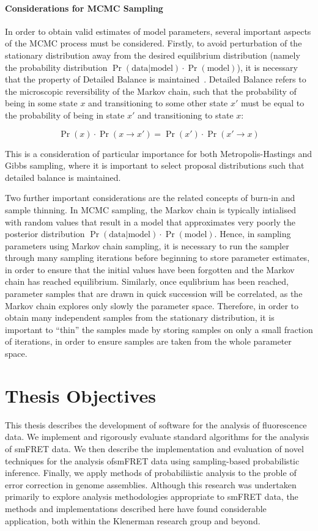 \paragraph{Considerations for MCMC Sampling}
In order to obtain valid estimates of model parameters, several important aspects of the MCMC process must be considered. Firstly, to avoid perturbation of the stationary distribution away from the desired equilibrium distribution (namely the probability distribution $\Pr(\text{data}|\text{model}) \cdot \Pr(\text{model})$), it is necessary that the property of Detailed Balance is maintained~\cite{???}. Detailed Balance refers to the microscopic reversibility of the Markov chain, such that the probability of being in some state $x$ and transitioning to some other state $x'$ must be equal to the probability of being in state $x'$ and transitioning to state $x$:

\begin{equation}
\Pr(x)\cdot\Pr(x \rightarrow x') = \Pr(x')\cdot\Pr(x' \rightarrow x)
\label{eq:balance}
\end{equation}

This is a consideration of particular importance for both Metropolis-Hastings and Gibbs sampling, where it is important to select proposal distributions such that detailed balance is maintained.

Two further important considerations are the related concepts of burn-in and sample thinning. In MCMC sampling, the Markov chain is typically intialised with random values that result in a model that approximates very poorly the posterior distribution $\Pr(\text{data}|\text{model}) \cdot \Pr(\text{model})$. Hence, in sampling parameters using Markov chain sampling, it is necessary to run the sampler through many sampling iterations before beginning to store parameter estimates, in order to ensure that the initial values have been forgotten and the Markov chain has reached equilibrium. Similarly, once equlibrium has been reached, parameter samples that are drawn in quick succession will be correlated, as the Markov chain explores only slowly the parameter space. Therefore, in order to obtain many independent samples from the stationary distribution, it is important to ``thin'' the samples made by storing samples on only a small fraction of iterations, in order to ensure samples are taken from the whole parameter space.    

\section{Thesis Objectives}
This thesis describes the development of software for the analysis of fluorescence data. We implement and rigorously evaluate standard algorithms for the analysis of smFRET data. We then describe the implementation and evaluation of novel techniques for the analysis ofsmFRET data using sampling-based probabilistic inference. Finally, we apply methods of probabiliistic analysis to the proble of error correction in genome assemblies. Although this research was undertaken primarily to explore analysis methodologies appropriate to smFRET data, the methods and implementations described here have found considerable application, both within the Klenerman research group and beyond.

